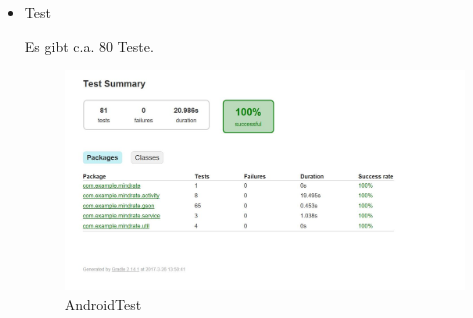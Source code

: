 \documentclass[a4paper]{scrreprt}
\begin{document}
               \begin{itemize}
               \item Test
               \par Es gibt c.a. 80 Teste.
               \begin{figure}[ht]
                    \centering
                    \includegraphics[scale = 0.5]{AndroidTest.jpg}
                    \caption{AndroidTest}
                \end{figure}


\end{itemize}
\end{document}

